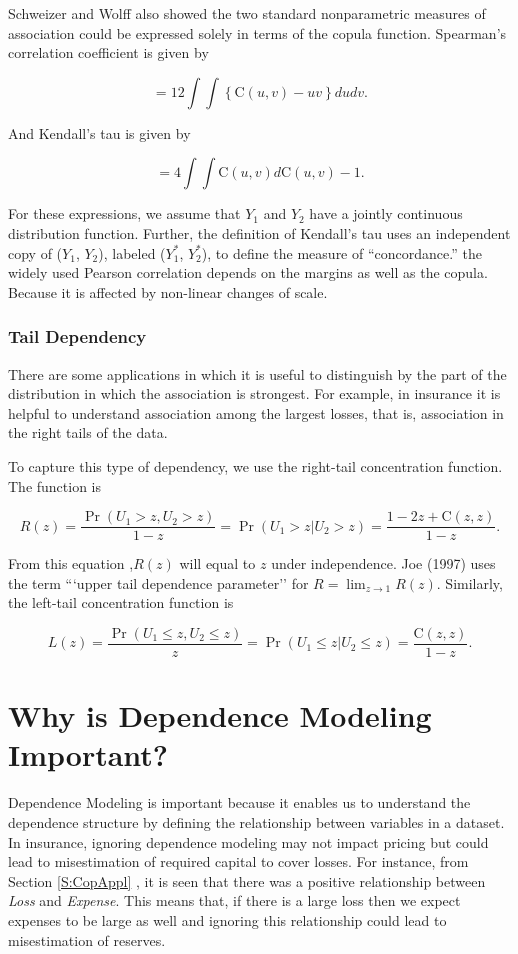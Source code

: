 \documentclass[]{book}
\theoremstyle{definition}
\theoremstyle{definition}
\theoremstyle{definition}
\theoremstyle{remark}
\begin{document}
Schweizer and Wolff also showed the two standard nonparametric measures
of association could be expressed solely in terms of the copula
function. Spearman's correlation coefficient is given by

\[= 12 \int \int \left\{\mathrm{C}(u,v) -
uv \right\} du dv.\]

And Kendall's tau is given by

\[= 4 \int \int \mathrm{C}(u,v)d\mathrm{C}(u,v) - 1 .\]

For these expressions, we assume that \(Y_1\) and \(Y_2\) have a jointly
continuous distribution function. Further, the definition of Kendall's
tau uses an independent copy of (\(Y_1\), \(Y_2\)), labeled
(\(Y_1^{\ast}\), \(Y_2^{\ast}\)), to define the measure of
``concordance.'' the widely used Pearson correlation depends on the
margins as well as the copula. Because it is affected by non-linear
changes of scale.

\subsubsection{Tail Dependency}\label{tail-dependency}

There are some applications in which it is useful to distinguish by the
part of the distribution in which the association is strongest. For
example, in insurance it is helpful to understand association among the
largest losses, that is, association in the right tails of the data.

To capture this type of dependency, we use the right-tail concentration
function. The function is

\[R(z) = \frac{\Pr(U_1 >z, U_2 > z)}{1-z} =\Pr(U_1 > z | U_2 > z)
=\frac{1 - 2z + \mathrm{C}(z,z)}{1-z} .\]

From this equation ,\(R(z)\) will equal to \(z\) under independence. Joe
(1997) uses the term ```upper tail dependence parameter'' for
\(R = \lim_{z \rightarrow 1} R(z)\). Similarly, the left-tail
concentration function is

\[L(z) = \frac{\Pr(U_1 \leq z, U_2 \leq z)}{z}=\Pr(U_1 \leq z | U_2
\leq z) =\frac{ \mathrm{C}(z,z)}{1-z}.\]

\section{Why is Dependence Modeling Important?}\label{S:CopImp}

Dependence Modeling is important because it enables us to understand the
dependence structure by defining the relationship between variables in a
dataset. In insurance, ignoring dependence modeling may not impact
pricing but could lead to misestimation of required capital to cover
losses. For instance, from Section \ref{S:CopAppl} , it is seen that
there was a positive relationship between \emph{Loss} and
\emph{Expense}. This means that, if there is a large loss then we expect
expenses to be large as well and ignoring this relationship could lead
to misestimation of reserves.
\end{document}

